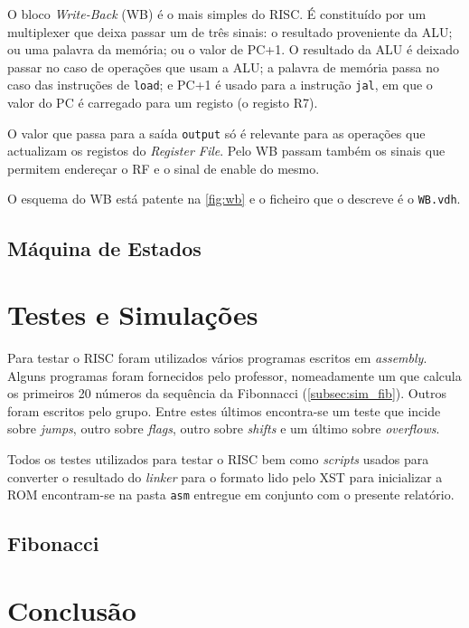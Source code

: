\documentclass[a4paper]{article}
\begin{document}
			O bloco \textit{Write-Back} (WB) é o mais simples do \textmu RISC. É constituído por um multiplexer que deixa passar um de três sinais: o resultado proveniente da ALU; ou uma palavra da memória; ou o valor de PC+1. O resultado da ALU é deixado passar no caso de operações que usam a ALU; a palavra de memória passa no caso das instruções de \texttt{load}; e PC+1 é usado para a instrução \texttt{jal}, em que o valor do PC é carregado para um registo (o registo R7).
			
			O valor que passa para a saída \texttt{output} só é relevante para as operações que actualizam os registos do \textit{Register File}. Pelo WB passam também os sinais que permitem endereçar o RF e o sinal de enable do mesmo.
			
			O esquema do WB está patente na \autoref{fig:wb} e o ficheiro que o descreve é o \texttt{WB.vdh}.
			

		\subsection{Máquina de Estados}
		
	\section{Testes e Simulações}
	
		Para testar o \textmu RISC foram utilizados vários programas escritos em \textit{assembly}. Alguns programas foram fornecidos pelo professor, nomeadamente um que calcula os primeiros 20 números da sequência da Fibonnacci (\autoref{subsec:sim_fib}). Outros foram escritos pelo grupo. Entre estes últimos encontra-se um teste que incide sobre \textit{jumps}, outro sobre \textit{flags}, outro sobre \textit{shifts} e um último sobre \textit{overflows}.
		
		Todos os testes utilizados para testar o \textmu RISC bem como \textit{scripts} usados para converter o resultado do \textit{linker} para o formato lido pelo XST para inicializar a ROM encontram-se na pasta \texttt{asm} entregue em conjunto com o presente relatório.
	
		\subsection{Fibonacci}
		\label{subsec:sim_fib}
		
	\section{Conclusão}

	
	\nocite{xilinx}
\end{document}
